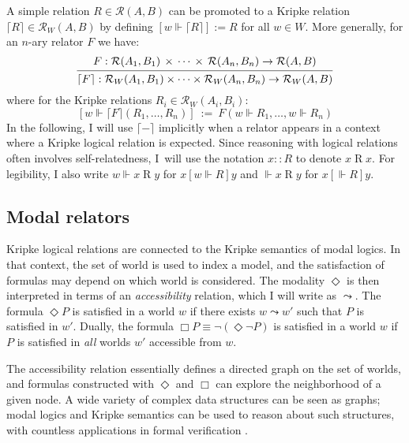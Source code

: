 \documentclass[11pt,oneside,draft]{book}
\theoremstyle{definition}
\newcommand{\ifr}[1]{\mathrel{[{#1}]}}
\begin{document}
A simple relation $R \in \mathcal{R}(A, B)$
can be promoted to a Kripke relation
$\lceil R \rceil \in \mathcal{R}_W(A, B)$
by defining $[w \Vdash \lceil R \rceil] := R$ for all $w \in W$.
More generally, for an $n$-ary relator $F$ we have:
\[
  \begin{prooftree}
  \hypo{
    F :
      \mathcal{R}(A_1, B_1) \,\times\,\cdots\,\times\,\mathcal{R}(A_n, B_n)
      \rightarrow \mathcal{R}(A, B)}
  \infer1{
    \lceil F \rceil :
      \mathcal{R}_W(A_1, B_1) \times \cdots \times \mathcal{R}_W(A_n, B_n)
      \rightarrow \mathcal{R}_W(A, B)}
  \end{prooftree}
\]
where for the Kripke relations $R_i \in \mathcal{R}_W(A_i, B_i)$:
\[
  [w \Vdash \lceil F \rceil (R_1, \ldots, R_n)] \: := \:
    F(w \Vdash R_1, \ldots, w \Vdash R_n)
\]
In the following,
I will use $\lceil - \rceil$ implicitly
when a relator appears in a context where
a Kripke logical relation is expected.
Since reasoning with logical relations
often involves self-relatedness,
I~will use the notation
$x :: R$ to denote $x \mathrel{R} x$.
For legibility, I also write
$w \Vdash x \mathrel{R} y$ for $x \ifr{w \Vdash R} y$
and $\Vdash x \mathrel{R} y$ for $x \ifr{\Vdash R} y$.


\subsection{Modal relators} \label{sec:modrel} %

Kripke logical relations are connected to
the Kripke semantics of modal logics.
In that context,
the set of world is used to index a model,
and the satisfaction of formulas may depend on
which world is considered.
The modality $\Diamond$ is then interpreted in terms of
an \emph{accessibility} relation, which I will write as $\leadsto$.
The formula $\Diamond P$ is satisfied in a world $w$
if there exists $w \leadsto w'$ such that $P$ is satisfied in $w'$.
Dually,
the formula $\Box P \equiv \neg (\Diamond \neg P)$
is satisfied in a world $w$
if $P$ is satisfied in \emph{all} worlds $w'$
accessible from $w$.

The accessibility relation essentially defines
a directed graph on the set of worlds,
and formulas constructed with $\Diamond$ and $\Box$
can explore the neighborhood of a given node.
A wide variety of complex data structures
can be seen as graphs;
modal logics and Kripke semantics
can be used to reason about such structures,
with countless applications in formal verification
\citep{modlog}.
\end{document}
